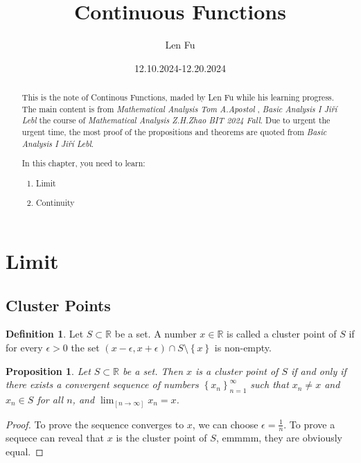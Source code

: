 \documentclass{article}
\title{Continuous Functions}
\author{Len Fu}
\date{12.10.2024-12.20.2024}
\newtheorem{prop}[theorem]{Proposition}
\theoremstyle{definition}
\newtheorem{defi}{Definition}[section]
\begin{document}
\maketitle

\begin{abstract}
This is the note of Continous Functions, maded by Len Fu while his learning progress.
The main content is from \textit{Mathematical Analysis Tom A.Apostol} , \textit{Basic Analysis I Jiří Lebl} the course of \textit{Mathematical Analysis Z.H.Zhao BIT 2024 Fall}.
Due to urgent the urgent time, the most proof of the propositions and theorems are quoted from \textit{Basic Analysis I Jiří Lebl}.

In this chapter,  you need to learn:
\begin{enumerate}
    \item Limit 
    \item Continuity
\end{enumerate}
\end{abstract}


\renewcommand{\contentsname}{Contents}
\tableofcontents
\newpage

\section{Limit}
\subsection{Cluster Points}
\begin{defi}
Let $S\subset \mathbb{R}$ be a set. A number $x\in\mathbb{R}$ is called a cluster point of $S$ if for every $\epsilon>0$
 the set $(x-\epsilon,x+\epsilon)\cap S\setminus \left\{x\right\}$ is non-empty.

\end{defi}

\begin{prop}
Let $S\subset \mathbb{R}$ be a set. Then $x$ is a cluster point of $S$ if and only if there exists a convergent sequence of numbers $\left\{x_{n}\right\}_{n=1}^{\infty}$
such that $x_{n}\neq x$ and $x_{n}\in S$ for all $n$, and $\lim_[n\rightarrow \infty]x_{n}=x$.
\end{prop}

\begin{proof}
To prove the sequence converges to $x$, we can choose $\epsilon=\frac{1}{n}$. To prove a sequece can reveal that $x$ is the cluster point of $S$, emmmm, they are obviously equal.
\end{proof}
\end{document}
